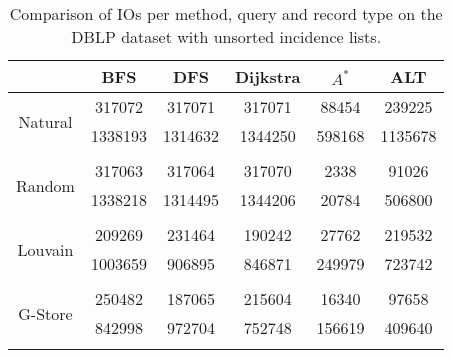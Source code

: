 \begin{table}
	\begin{center}
		 \begin{tabular}[c]{c c c c c c} \toprule
			  & BFS & DFS & Dijkstra & $A^*$  & ALT \\ \midrule 
 			\multirow{2}{*}{Natural}  & 317072 & 317071 & 317071 & 88454 & 239225 \\ 
 				 & 1338193 & 1314632 & 1344250 & 598168 & 1135678 \\ 
 				&&&&& \\[-0.5em]
 			\multirow{2}{*}{Random}  & 317063 & 317064 & 317070 & 2338 & 91026 \\ 
 				 & 1338218 & 1314495 & 1344206 & 20784 & 506800 \\ 
 				&&&&& \\[-0.5em]
 			\multirow{2}{*}{Louvain}  & 209269 & 231464 & 190242 & 27762 & 219532 \\ 
 				 & 1003659 & 906895 & 846871 & 249979 & 723742 \\ 
 				&&&&& \\[-0.5em]
 			\multirow{2}{*}{G-Store}  & 250482 & 187065 & 215604 & 16340 & 97658 \\ 
 				 & 842998 & 972704 & 752748 & 156619 & 409640 \\ 
 				&&&&& \\[-0.5em]
 					\end{tabular}  
  	 \end{center}
	 \caption{Comparison of IOs per method, query and record type on the DBLP dataset with unsorted incidence lists.}
	 \label{dblp-uns}
\end{table}
